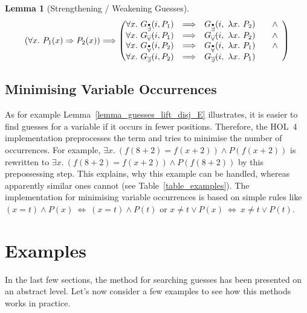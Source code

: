 \documentclass[a4paper,12pt,DIV=12,oneside]{scrbook}
\newtheorem{lemma}{Lemma}[section]
\theoremstyle{definition}
\theoremstyle{remark}
\newcommand{\GEP}{\ensuremath{G_{\accentset{\bullet}{\exists}}}}
\newcommand{\GEG}{\ensuremath{G_{\accentset{\_\,\_}{\exists}}}}
\newcommand{\GUP}{\ensuremath{G_{\accentset{\bullet}{\forall}}}}
\newcommand{\GUG}{\ensuremath{G_{\accentset{\_\,\_}{\forall}}}}
\begin{document}
\begin{lemma}[Strengthening / Weakening Guesses]\label{lemma_guesses_strengthen_weaken}
\[
\left(\forall x.\ P_1(x) \Rightarrow P_2(x)\right) \Longrightarrow 
\left(\begin{array}{@{}rcl}
\forall x.\ \GEP(i, P_1) & \Longrightarrow & \GEP(i,\ \lambda x.\ P_2) \qquad \wedge\\
\forall x.\ \GUG(i, P_1) & \Longrightarrow & \GUG(i,\ \lambda x.\ P_2) \qquad \wedge\\
\forall x.\ \GUP(i, P_2) & \Longrightarrow & \GUP(i,\ \lambda x.\ P_1) \qquad \wedge\\
\forall x.\ \GEG(i, P_2) & \Longrightarrow & \GEG(i,\ \lambda x.\ P_1)
\end{array}
\right)
\]
\end{lemma}



\subsection{Minimising Variable Occurrences}\label{subsec_varmin}

As for example Lemma~\ref{lemma_guesses_lift_disj_E} illustrates, it
is easier to find guesses for a variable if it occurs in fewer 
positions. Therefore, the HOL~4 implementation preprocesses the term and tries to
minimise the number of occurrences. For example,
$\exists x.\ (f (8 + 2) = f (x + 2)) \wedge P (f (x + 2))$ is
rewritten to $\exists x.\ (f (8 + 2) = f (x + 2)) \wedge P (f (8 +
2))$ by this prepossessing step. This explains, why this example
can be handled, whereas apparently similar ones cannot (see Table~\ref{table_examples}).
The implementation for minimising variable occurrences is based 
on simple rules like $(x = t) \wedge P(x)
\ \Longleftrightarrow\ (x = t) \wedge P(t)$ or $x \neq t \vee P(x)
\ \Longleftrightarrow\ x \neq t \vee P(t)$. 


\section{Examples}\label{sec_examples}

In the last few sections, the method for searching guesses has been presented on an abstract level.
Let's now consider a few examples to see how this methods works in practice.
\end{document}
